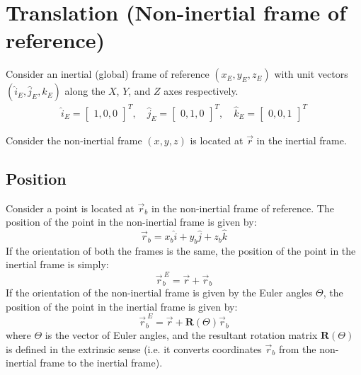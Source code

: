 \section{Translation (Non-inertial frame of reference)}
Consider an inertial (global) frame of reference \((x_E, y_E, z_E)\) with unit vectors \((\hat{i}_E, \hat{j}_E, \hat{k}_E)\) along the \(X\), \(Y\), and \(Z\) axes respectively. \\
\begin{equation} \nonumber
    \begin{aligned}
        \hat{i}_E = \begin{bmatrix}
                        1,0,0
                    \end{bmatrix}^T, \quad
        \hat{j}_E = \begin{bmatrix}
                        0,1,0
                    \end{bmatrix}^T, \quad
        \hat{k}_E = \begin{bmatrix}
                        0,0,1
                    \end{bmatrix}^T
    \end{aligned}
\end{equation}

Consider the non-inertial frame \((x, y, z)\) is located at \(\vec{r}\) in the inertial frame.
\subsection{Position}

Consider a point is located at \(\vec{r}_b\) in the non-inertial frame of reference.
The position of the point in the non-inertial frame is given by:
\begin{equation} \nonumber
    \vec{r}_b = x_b \hat{i} + y_b \hat{j} + z_b \hat{k}
\end{equation}
If the orientation of both the frames is the same, the position of the point in the inertial frame is simply:
\begin{equation} \nonumber
    \vec{r}^{\ E}_b = \vec{r} + \vec{r}_b
\end{equation}
If the orientation of the non-inertial frame is given by the Euler angles \( \Theta \), the position of the point in the inertial frame is given by:
\begin{equation} \nonumber
    \vec{r}^{\ E}_b = \vec{r} + \mathbf{R}(\Theta) \vec{r}_b
\end{equation}
where \( \Theta \) is the vector of Euler angles, and the resultant rotation matrix \( \mathbf{R}(\Theta) \) is defined in the extrinsic sense (i.e. it converts coordinates \( \vec{r}_b \) from the non-inertial frame to the inertial frame).

